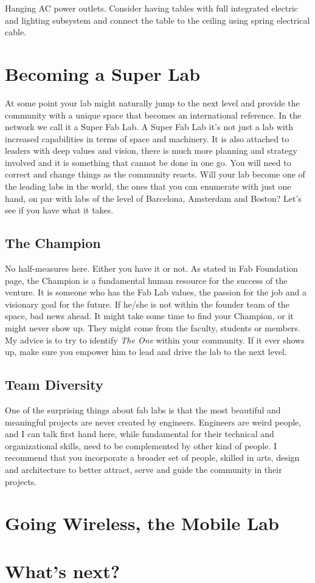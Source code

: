 \documentclass[a4paper,12pt,titlepage]{article}
\begin{document}
Hanging AC power outlets. Consider having tables with full integrated electric and lighting subsystem and connect the table to the ceiling using spring electrical cable.

\section{Becoming a Super Lab}
At some point your lab might naturally jump to the next level and provide the community with a unique space
that becomes an international reference. In the network we call it a Super Fab Lab. A
Super Fab Lab it's not just a lab with increased capabilities in terms of space and
machinery. It is also attached to leaders with  deep values and vision, there is much more planning and strategy involved and it is something that
cannot be done in one go. You will need to correct and change things as the
community reacts. Will your lab become one of the
leading labs in the world, the ones that you can enumerate with just one hand, on par
with labs of the level of Barcelona, Amsterdam and Boston? Let's see if you have what it takes.
\subsection{The Champion}
No half-measures here. Either you have it or not. As stated in Fab Foundation page, the Champion is a fundamental human resource for the success of the
venture. It is someone who has the Fab Lab values, the passion for the job and a visionary goal for
the future. If he/she is not within the founder team of the space, bad news ahead. It might take some time to find your Champion, or it might never show up. They might
come from the faculty, students or members. My advice is to try to identify \textit{The One} within your community. If it
ever shows up, make sure you empower him to lead and drive the lab to the next level.

\subsection{Team Diversity}
One of the surprising things about fab labs is that the most beautiful and meaningful projects are never created by engineers. Engineers are weird people, and I can talk first hand here, while fundamental for their technical and organizational skills, need to be complemented by other kind of people. I
recommend that you incorporate a broader set of people, skilled in arts, design and
architecture to better attract, serve and guide the community in their projects. 


\section{Going Wireless, the Mobile Lab}


\section{What's next?}
\end{document}
